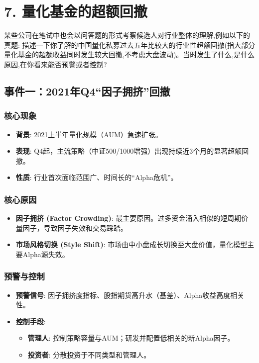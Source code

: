 \documentclass[UTF8]{ctexart}
\begin{document}
\section*{7. 量化基金的超额回撤}

某些公司在笔试中也会以问答题的形式考察候选人对行业整体的理解,例如以下的真题:
描述一下你了解的中国量化私募过去五年比较大的行业性超额回撤(指大部分量化基金的超额收益同时发生较大回撤,不考虑大盘波动)。当时发生了什么,是什么原因,在你看来能否预警或者控制?


\subsection*{事件一：2021年Q4“因子拥挤”回撤}

\subsubsection*{核心现象}
\begin{itemize}
    \item \textbf{背景}: 2021上半年量化规模（AUM）急速扩张。
    \item \textbf{表现}: Q4起，主流策略（中证500/1000增强）出现持续近3个月的显著超额回撤。
    \item \textbf{性质}: 行业首次面临范围广、时间长的“Alpha危机”。
\end{itemize}

\subsubsection*{核心原因}
\begin{itemize}
    \item \textbf{因子拥挤 (Factor Crowding)}: 最主要原因。过多资金涌入相似的短周期价量因子，导致因子失效和交易踩踏。
    \item \textbf{市场风格切换 (Style Shift)}: 市场由中小盘成长切换至大盘价值，量化模型主要Alpha源失效。
\end{itemize}

\subsubsection*{预警与控制}
\begin{itemize}
    \item \textbf{预警信号}: 因子拥挤度指标、股指期货高升水（基差）、Alpha收益高度相关性。
    \item \textbf{控制手段}:
    \begin{itemize}
        \item \textbf{管理人}: 控制策略容量与AUM；研发并配置低相关的新Alpha因子。
        \item \textbf{投资者}: 分散投资于不同类型和管理人。
    \end{itemize}
\end{itemize}
\end{document}
